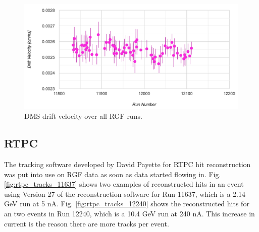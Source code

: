 \begin{figure}[h!]
	\centering
	\includegraphics[width=0.9\linewidth]{figures/DMS_vel_run.png}
	\caption{DMS drift velocity over all RGF runs.}
	\label{fig:dms_vel_run}
\end{figure}

\newpage
\subsection{RTPC}
The tracking software developed by David Payette for RTPC hit reconstruction was put into use on RGF data as soon as data started flowing in. Fig. \ref{fig:rtpc_tracks_11637} shows two examples of reconstructed hits in an event using Version 27 of the reconstruction software for Run 11637, which is a 2.14 GeV run at 5 nA. Fig. \ref{fig:rtpc_tracks_12240} shows the reconstructed hits for an two events in Run 12240, which is a 10.4 GeV run at 240 nA. This increase in current is the reason there are more tracks per event.


